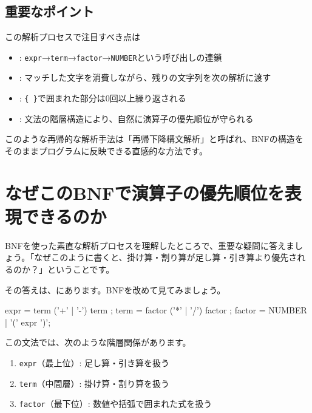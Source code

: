 \subsection{重要なポイント}

この解析プロセスで注目すべき点は

\begin{itemize}
\item
  :
  \texttt{expr}→\texttt{term}→\texttt{factor}→\texttt{NUMBER}という呼び出しの連鎖
\item
  :
  マッチした文字を消費しながら、残りの文字列を次の解析に渡す
\item
  :
  \texttt{\{\ \}}で囲まれた部分は0回以上繰り返される
\item
  :
  文法の階層構造により、自然に演算子の優先順位が守られる
\end{itemize}

このような再帰的な解析手法は「再帰下降構文解析」と呼ばれ、BNFの構造をそのままプログラムに反映できる直感的な方法です。

\section{なぜこのBNFで演算子の優先順位を表現できるのか}

BNFを使った素直な解析プロセスを理解したところで、重要な疑問に答えましょう。「なぜこのように書くと、掛け算・割り算が足し算・引き算より優先されるのか？」ということです。

その答えは、にあります。BNFを改めて見てみましょう。

\begin{codescreen}{}
expr = term { ('+' | '-') term };
term = factor { ('*' | '/') factor };
factor = NUMBER | '(' expr ')';
\end{codescreen}

この文法では、次のような階層関係があります。

\begin{enumerate}
\item
  \texttt{expr}（最上位）: 足し算・引き算を扱う
\item
  \texttt{term}（中間層）: 掛け算・割り算を扱う
\item
  \texttt{factor}（最下位）: 数値や括弧で囲まれた式を扱う
\end{enumerate}

